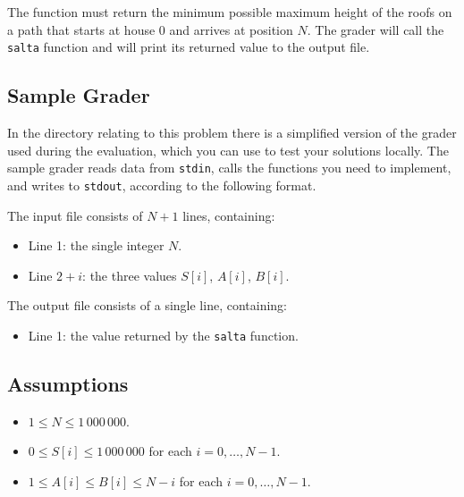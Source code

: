 \documentclass[11pt, a4paper]{article}
\begin{document}
The function must return the minimum possible maximum height of the roofs on a path that starts at house $0$ and arrives at position $N$.
The grader will call the \texttt{salta} function and will print its returned value to the output file.

\subsection*{Sample Grader}
In the directory relating to this problem there is a simplified version of the grader used during the evaluation, which you can use to test your solutions locally.
The sample grader reads data from \texttt{stdin}, calls the functions you need to implement, and writes to \texttt{stdout}, according to the following format.

The input file consists of $N+1$ lines, containing:
\begin{itemize}
    \item Line 1: the single integer $N$.
    \item Line $2+i$: the three values $S[i]$, $A[i]$, $B[i]$.
\end{itemize}

The output file consists of a single line, containing:
\begin{itemize}
    \item Line 1: the value returned by the \texttt{salta} function.
\end{itemize}

\subsection*{Assumptions}
\begin{itemize}
    \item $1\le N\le 1\,000\,000$.
    \item $0\le S[i]\le 1\,000\,000$ for each $i=0,\dots,N-1$.
    \item $1\le A[i]\le B[i]\le N-i$ for each $i=0,\dots,N-1$.
\end{itemize}
\end{document}
